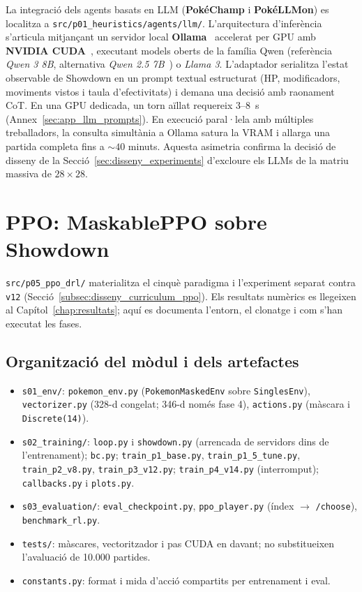 La integració dels agents basats en LLM (\textbf{PokéChamp} i \textbf{PokéLLMon}) es localitza a \texttt{src/p01\_heuristics/agents/llm/}. L'arquitectura d'inferència s'articula mitjançant un servidor local \textbf{Ollama}~\cite{ollama_2023} accelerat per GPU amb \textbf{NVIDIA CUDA}~\cite{nvidia_cuda}, executant models oberts de la família Qwen (referència \textit{Qwen 3 8B}, alternativa \textit{Qwen 2.5 7B}~\cite{qwen_2024}) o \textit{Llama 3}. L'adaptador serialitza l'estat observable de Showdown en un prompt textual estructurat (HP, modificadors, moviments vistos i taula d'efectivitats) i demana una decisió amb raonament CoT. En una GPU dedicada, un torn aïllat requereix $3$--$8$~s (Annex~\ref{sec:app_llm_prompts}). En execució paral·lela amb múltiples treballadors, la consulta simultània a Ollama satura la VRAM i allarga una partida completa fins a $\sim 40$ minuts. Aquesta asimetria confirma la decisió de disseny de la Secció~\ref{sec:disseny_experiments} d'excloure els LLMs de la matriu massiva de $28 \times 28$.

\section{PPO: MaskablePPO sobre Showdown}
\label{sec:ppo_impl}

\texttt{src/p05\_ppo\_drl/} materialitza el cinquè paradigma i l'experiment separat contra \texttt{v12} (Secció~\ref{subsec:disseny_curriculum_ppo}). Els resultats numèrics es llegeixen al Capítol~\ref{chap:resultats}; aquí es documenta l'entorn, el clonatge i com s'han executat les fases.

\subsection{Organització del mòdul i dels artefactes}

\begin{itemize}
    \item \texttt{s01\_env/}: \texttt{pokemon\_env.py} (\texttt{PokemonMaskedEnv} sobre \texttt{SinglesEnv}), \texttt{vectorizer.py} (328-d congelat; 346-d només fase 4), \texttt{actions.py} (màscara i \texttt{Discrete(14)}).
    \item \texttt{s02\_training/}: \texttt{loop.py} i \texttt{showdown.py} (arrencada de servidors dins de l'entrenament); \texttt{bc.py}; \texttt{train\_p1\_base.py}, \texttt{train\_p1\_5\_tune.py}, \texttt{train\_p2\_v8.py}, \texttt{train\_p3\_v12.py}; \texttt{train\_p4\_v14.py} (interromput); \texttt{callbacks.py} i \texttt{plots.py}.
    \item \texttt{s03\_evaluation/}: \texttt{eval\_checkpoint.py}, \texttt{ppo\_player.py} (índex $\to$ \texttt{/choose}), \texttt{benchmark\_rl.py}.
    \item \texttt{tests/}: màscares, vectoritzador i pas CUDA en davant; no substitueixen l'avaluació de 10.000 partides.
    \item \texttt{constants.py}: format i mida d'acció compartits per entrenament i eval.
\end{itemize}

